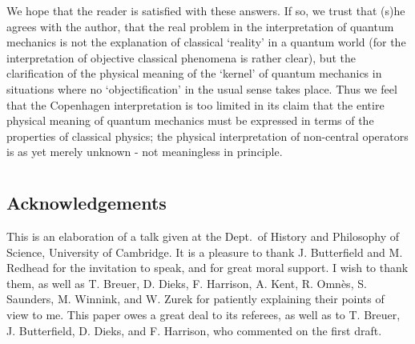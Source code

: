 We hope that the reader is satisfied with these answers. If so, we trust that
(s)he agrees with the
author, that the real problem in the interpretation of quantum mechanics is not
the explanation of
classical `reality' in a quantum world (for the interpretation of objective
classical phenomena is
rather clear), but the clarification of the physical meaning of the `kernel' of
quantum mechanics in
situations where no `objectification' in the usual sense takes place.
Thus we feel that the Copenhagen interpretation is too limited in its claim
that the entire physical
 meaning of quantum mechanics must be expressed
in terms of  the properties of classical physics; the physical
interpretation of
non-central operators is as yet merely unknown - not meaningless in principle.

\section*{\mbox{}}
\subsection*{Acknowledgements}
This is an elaboration of a talk given at the Dept.\ of History and Philosophy
of Science,
University of Cambridge. It is a pleasure to thank J. Butterfield and M.
Redhead for the invitation
to speak, and for great moral support. I wish to thank them, as well as T.
Breuer, D. Dieks, F.
Harrison,  A. Kent, R. Omn\`{e}s, S. Saunders, M. Winnink,  and W. Zurek for
patiently explaining
their points of view to me. This paper owes a great deal to its referees, as
well as to
 T. Breuer, J. Butterfield, D. Dieks, and F.
Harrison, who commented on the first draft.
%
\newpage
